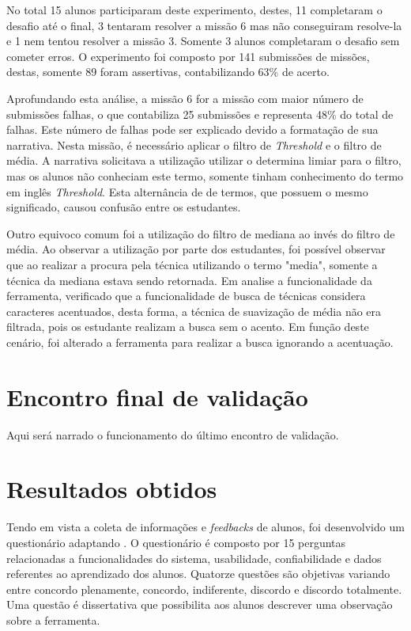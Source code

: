 \documentclass[
	12pt,				%
	oneside,			%
	a4paper,			%
	english,			%
	french,				%
	spanish,			%
	brazil,				%
	]{abntex2}
\begin{document}
No total 15 alunos participaram deste experimento, destes, 11 completaram o desafio até o final, 3 tentaram resolver a missão 6 mas não conseguiram resolve-la e 1 nem tentou resolver a missão 3. Somente 3 alunos completaram o desafio sem cometer erros. O experimento foi composto por 141 submissões de missões, destas, somente 89 foram assertivas, contabilizando 63\% de acerto.

Aprofundando esta análise, a missão 6 for a missão com maior número de submissões falhas, o que contabiliza 25 submissões e representa 48\% do total de falhas. Este número de falhas pode ser explicado devido a formatação de sua narrativa. Nesta missão, é necessário aplicar o filtro de \textit{Threshold} e o filtro de média. A narrativa solicitava a utilização utilizar o determina limiar para o filtro, mas os alunos não conheciam este termo, somente tinham conhecimento do termo em inglês \textit{Threshold}. Esta alternância de de termos, que possuem o mesmo significado, causou confusão entre os estudantes. 

Outro equivoco comum foi a utilização do filtro de mediana ao invés do filtro de média. Ao observar a utilização por parte dos estudantes, foi possível observar que ao realizar a procura pela técnica utilizando o termo "media", somente a técnica da mediana estava sendo retornada. Em analise a funcionalidade da ferramenta, verificado que a funcionalidade de busca de técnicas considera caracteres acentuados, desta forma, a técnica de suavização de média não era filtrada, pois os estudante realizam a busca sem o acento. Em função deste cenário, foi alterado a ferramenta para realizar a busca ignorando a acentuação. 

\section{Encontro final de validação}
\label{sec:validacaoEncontroFinal}

Aqui será narrado o funcionamento do último encontro de validação.

\section{Resultados obtidos}
\label{sec:resultadosObtidos}

Tendo em vista a coleta de informações e \textit{feedbacks} de alunos, foi desenvolvido um questionário adaptando \cite{bez2013}. O questionário é composto por 15 perguntas relacionadas a funcionalidades do sistema, usabilidade, confiabilidade e dados referentes ao aprendizado dos alunos. Quatorze questões são objetivas variando entre concordo plenamente, concordo, indiferente, discordo e discordo totalmente. Uma questão é dissertativa que possibilita aos alunos descrever uma observação sobre a ferramenta.
\end{document}
